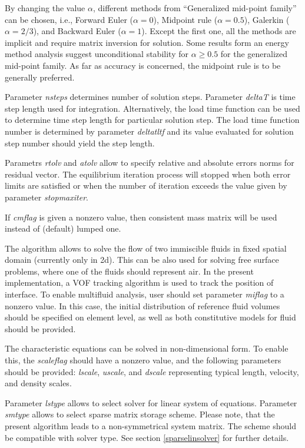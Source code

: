 \documentclass[draft]{article}
\newcommand{\param}[1]{{\em #1}}
\begin{document}
By changing the value $\alpha$, different methods from
``Generalized mid-point family'' can be chosen, i.e., 
Forward Euler ($\alpha=0$), Midpoint rule ($\alpha=0.5$),
 Galerkin ($\alpha=2/3$), and  Backward Euler ($\alpha=1$). Except
the first one, all the methods are implicit and require matrix inversion for solution. 
Some results form an energy method analysis suggest unconditional
stability for $\alpha\ge 0.5$ for the generalized mid-point family. As
far as accuracy is concerned, the midpoint rule is to be generally preferred. 

Parameter \param{nsteps} determines number of solution
steps. Parameter \param{deltaT} is time step length used for
integration. Alternatively, the load time function can be used to
determine time step length for particular solution step. The load time
function number is determined by parameter \param{deltatltf} and its
value evaluated for solution step number should yield the step length.

Parametrs \param{rtolv} and \param{atolv} allow to
specify relative and absolute errors norms for residual vector.
The equilibrium iteration process will stopped when both error limits
are satisfied or when the number of iteration exceeds the value given
by parameter \param{stopmaxiter}.

If \param{cmflag} is given a nonzero value, then
consistent mass matrix will be used instead of (default) lumped one.

The algorithm allows to solve the flow of two immiscible fluids in
fixed spatial domain (currently only in 2d). This can be also used for
solving free surface problems, where one of the fluids should
represent air. In the present implementation, a VOF tracking algorithm
is used to track the position of interface. To enable multifluid
analysis, user should set parameter \param{miflag} to a nonzero
value. In this case, the initial distribution of reference fluid
volumes should be specified on element level, as well as both
constitutive models for fluid should be provided.

The characteristic equations can be solved in non-dimensional form. To
enable this, the \param{scaleflag} should have a nonzero value,
and the following parameters should be provided: \param{lscale},
\param{uscale}, and \param{dscale} representing typical length,
velocity, and density scales. 

Parameter \param{lstype} allows to select solver for linear system of
equations. Parameter \param{smtype} allows to select sparse matrix storage
scheme. Please note, that the present algorithm leads to a
non-symmetrical system
matrix. The scheme should be compatible with solver type. See section
\ref{sparselinsolver} for further details.
\end{document}
